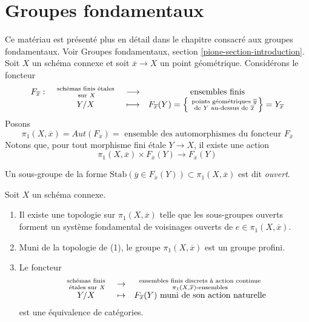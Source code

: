 \section{Groupes fondamentaux}
\label{section-fundamental-groups}

\noindent
Ce matériau est présenté plus en détail dans le chapitre consacré aux
groupes fondamentaux. Voir
Groupes fondamentaux, section \ref{pione-section-introduction}.
Soit $X$ un schéma connexe et soit $\overline{x}\to X$ un
point géométrique. Considérons le foncteur
$$
\begin{matrix}
F_{\overline{x}}: &
\text{ schémas finis \'etales } \atop \text{ sur } X &
\longrightarrow & \text{ ensembles finis} \\
&
Y/X &
\longmapsto &
F_{\overline{x}}(Y) =
\left\{\text{ points géométriques }\overline y \atop \text{ de } Y
\text{ au-dessus de }\overline{x}\right\} = Y_{\overline{x}}
\end{matrix}
$$
Posons
$$
\pi_1(X, \overline{x})
=
Aut(F_{\overline{x}})
=
\text{ ensemble des automorphismes du foncteur }F_{\overline{x}}
$$
Notons que, pour tout morphisme fini \'etale $Y \to X$, il existe une action
$$
\pi_1(X, \overline{x}) \times F_{\overline{x}}(Y) \to F_{\overline{x}}(Y)
$$

\begin{definition}
\label{definition-open}
Un sous-groupe de la forme
$\text{Stab}(\overline y\in F_{\overline{x}}(Y))\subset \pi_1(X, \overline{x})$
est dit {\it ouvert}.
\end{definition}

\begin{theorem}[Grothendieck]
\label{theorem-fundamental-group}
Soit $X$ un schéma connexe.
\begin{enumerate}
\item Il existe une topologie sur $\pi_1(X, \overline{x})$ telle que les sous-groupes
ouverts forment un système fondamental de voisinages ouverts de $e\in \pi_1(X, \overline
x)$.
\item Muni de la topologie de (1), le groupe
$\pi_1(X, \overline{x})$ est un groupe profini.
\item Le foncteur
$$
\begin{matrix}
\text{ schémas finis } \atop \text{ \'etales sur }X & \to &
\text{ ensembles finis discrets à action continue } \atop \pi_1(X, \overline{x})\text{-ensembles}\\
Y / X& \mapsto & F_{\overline{x}}(Y) \text{ muni de son action naturelle}
\end{matrix}
$$
est une équivalence de catégories.
\end{enumerate}
\end{theorem}

